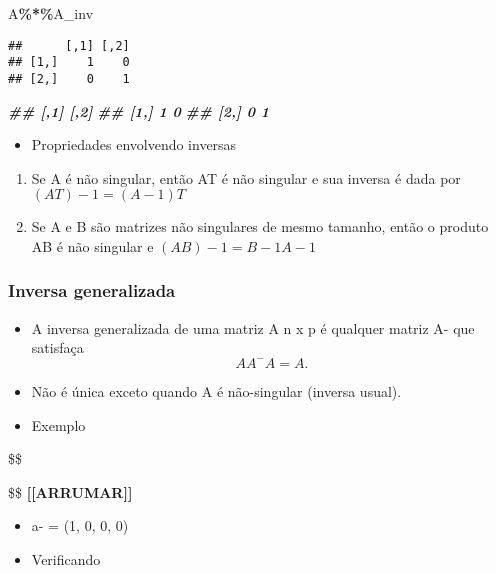 \documentclass[
]{article}
\newenvironment{Shaded}{\begin{snugshade}}{\end{snugshade}}
\newcommand{\DocumentationTok}[1]{\textcolor[rgb]{0.56,0.35,0.01}{\textbf{\textit{#1}}}}
\newcommand{\NormalTok}[1]{#1}
\newcommand{\SpecialCharTok}[1]{\textcolor[rgb]{0.81,0.36,0.00}{\textbf{#1}}}
\providecommand{\tightlist}{%
  \setlength{\itemsep}{0pt}\setlength{\parskip}{0pt}}
\begin{document}
\begin{Shaded}
\begin{Highlighting}[]
\NormalTok{A}\SpecialCharTok{\%*\%}\NormalTok{A\_inv}
\end{Highlighting}
\end{Shaded}

\begin{verbatim}
##      [,1] [,2]
## [1,]    1    0
## [2,]    0    1
\end{verbatim}

\begin{Shaded}
\begin{Highlighting}[]
\DocumentationTok{\#\# [,1] [,2]}
\DocumentationTok{\#\# [1,] 1 0}
\DocumentationTok{\#\# [2,] 0 1}
\end{Highlighting}
\end{Shaded}

\begin{itemize}
\tightlist
\item
  Propriedades envolvendo inversas
\end{itemize}

\begin{enumerate}
\def\labelenumi{\arabic{enumi}.}
\tightlist
\item
  Se A é não singular, então AT é não singular e sua inversa é dada por
  \((AT)-1 = (A-1)T\)
\item
  Se A e B são matrizes não singulares de mesmo tamanho, então o produto
  AB é não singular e \((AB)-1 = B-1 A-1\)
\end{enumerate}

\hypertarget{inversa-generalizada}{%
\subsubsection{Inversa generalizada}\label{inversa-generalizada}}

\begin{itemize}
\item
  A inversa generalizada de uma matriz A n x p é qualquer matriz A- que
  satisfaça \[
  AA^{-}A = A.
  \]
\item
  Não é única exceto quando A é não-singular (inversa usual).
\item
  Exemplo
\end{itemize}

\$\$

\$\$ \textbf{{[}{[}ARRUMAR{]}{]}}

\begin{itemize}
\item
  a- = (1, 0, 0, 0)
\item
  Verificando
\end{itemize}
\end{document}
